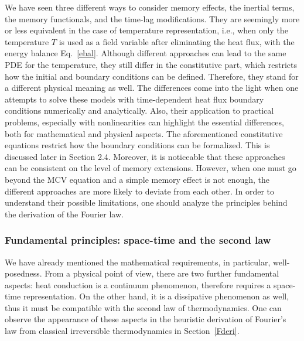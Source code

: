 \documentclass[sn-mathphys]{sn-jnl}%
\theoremstyle{thmstyleone}%
\theoremstyle{thmstyletwo}%
\theoremstyle{thmstylethree}%
\begin{document}
{{We have seen three different ways to consider memory effects, the inertial terms, the memory functionals, and the time-lag modifications.
They are seemingly more or less equivalent in the case of temperature representation, i.e., when only the temperature $T$ is used as a field variable after eliminating the heat flux, with the energy balance Eq.~\eqref{ebal}. Although different approaches can lead to the same PDE for the temperature, they still differ in the constitutive part, which restricts how the initial and boundary conditions can be defined. Therefore, they stand for a different physical meaning as well. The differences come into the light when one attempts to solve these models with time-dependent heat flux boundary conditions numerically and analytically. Also, their application to practical problems, especially with nonlinearities can highlight the essential differences, both for mathematical and physical aspects. The aforementioned constitutive equations restrict how the boundary conditions can be formalized.} This is discussed later in Section 2.4. Moreover, it is noticeable that these approaches can be consistent on the level of memory extensions. However, when one must go beyond the MCV equation and a simple memory effect is not enough, the different approaches are more likely to deviate from each other.
In order to understand their possible limitations, one should analyze the principles behind the derivation of the Fourier law.

\subsubsection{Fundamental principles: space-time and the second law}
We have already mentioned the mathematical requirements, in particular, well-posedness. From a physical point of view, there are two further fundamental aspects: heat conduction is a continuum phenomenon, therefore requires a space-time representation. On the other hand, it is a dissipative phenomenon as well, thus it must be compatible with the second law of thermodynamics. One can observe the appearance of these aspects in the heuristic derivation of Fourier's law from classical irreversible thermodynamics in Section~\ref{Fderi}.

}
\end{document}
